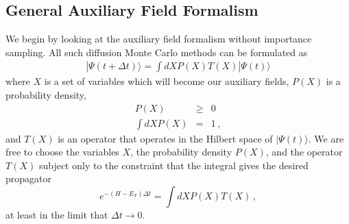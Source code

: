 
 \subsection{General Auxiliary Field Formalism}
 
 
 We begin by looking at the auxiliary field formalism without importance
 sampling.
 All such diffusion Monte Carlo methods can be formulated as
 \begin{eqnarray}
 \label{eq.afdmc}
 |\Psi(t+\Delta t)\rangle = \int dX P(X) T(X) |\Psi(t)\rangle
 \end{eqnarray}
 where $X$ is a set of variables which will become our auxiliary fields,
 $P(X)$ is a probability density,
 \begin{eqnarray}
 P(X) &\geq& 0
 \nonumber\\
 \int dX P(X) &=& 1\,,
 \end{eqnarray}
 and $T(X)$ is an operator that operates
 in the Hilbert space of $|\Psi(t)\rangle$.
 We are free to choose the variables $X$, the probability density $P(X)$,
 and the operator $T(X)$ subject only to the
 constraint that the integral gives the desired propagator
 \begin{equation}
 e^{-(H-E_T)\Delta t} = \int dX P(X) T(X) \,,
 \end{equation}
 at least in the limit that $\Delta t \rightarrow 0$.
 
